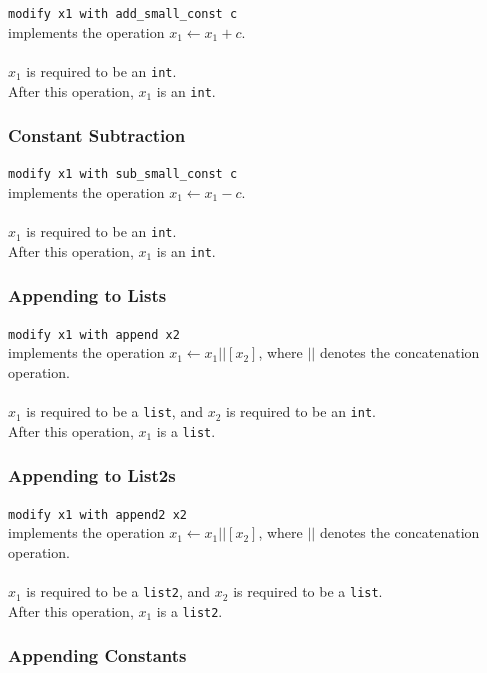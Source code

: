 \documentclass{report}
\begin{document}
\texttt{modify x1 with add\_small\_const c} \\
implements the operation $x_1 \leftarrow x_1 + c$. \\ \\
$x_1$ is required to be an \texttt{int}. \\
After this operation, $x_1$ is an \texttt{int}.

\subsubsection{Constant Subtraction}

\texttt{modify x1 with sub\_small\_const c} \\
implements the operation $x_1 \leftarrow x_1 - c$. \\ \\
$x_1$ is required to be an \texttt{int}. \\
After this operation, $x_1$ is an \texttt{int}.

\subsubsection{Appending to Lists}

\texttt{modify x1 with append x2} \\
implements the operation $x_1 \leftarrow x_1 || [x_2]$, where $||$ denotes the concatenation operation. \\ \\
$x_1$ is required to be a \texttt{list}, and $x_2$ is required to be an \texttt{int}. \\
After this operation, $x_1$ is a \texttt{list}.

\subsubsection{Appending to List2s}

\texttt{modify x1 with append2 x2} \\
implements the operation $x_1 \leftarrow x_1 || [x_2]$, where $||$ denotes the concatenation operation. \\ \\
$x_1$ is required to be a \texttt{list2}, and $x_2$ is required to be a \texttt{list}. \\
After this operation, $x_1$ is a \texttt{list2}.

\subsubsection{Appending Constants}
\end{document}
